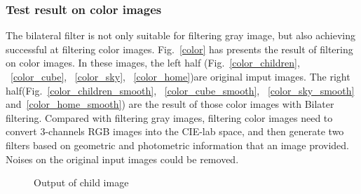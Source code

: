 \documentclass[12pt]{article}
\begin{document}
\subsubsection{Test result on color images}
The bilateral filter is not only suitable for filtering gray image, but also achieving successful at filtering color images.
Fig.~\ref{color} has presents the result of filtering on color images.
In these images, the left half (Fig.~\ref{color_children}, ~\ref{color_cube}, ~\ref{color_sky}, ~\ref{color_home})are original imput images.
The right half(Fig.~\ref{color_children_smooth}, ~\ref{color_cube_smooth}, ~\ref{color_sky_smooth} and~\ref{color_home_smooth}) are the result of those color images with Bilater filtering. 
Compared with filtering gray images, filtering color images need to convert 3-channels RGB images into the CIE-lab space, and then generate two filters based on geometric and photometric information that an image provided.
Noises on the original input images could be removed.

\begin{figure}[H]
  \centering
  \quad
  \caption{Output of child image}
  \label{color_child}
\end{figure}
\end{document}
